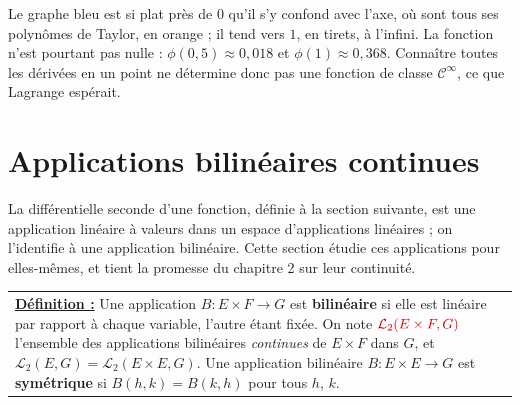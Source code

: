 \documentclass[a4paper,twoside]{report}
\newcommand{\mot}[1]{\textcolor{rougecours}{\textbf{#1}}}
\newcommand{\rmath}[1]{\textcolor{rougecours}{#1}}
\newcommand{\ee}{\mathrm{e}}                      %
\newcommand{\Cc}{\mathcal{C}}                     %
\newcommand{\Lc}{\mathcal{L}}                     %
\begin{document}
\begin{center}
\end{center}

\noindent Le graphe bleu est si plat près de $0$ qu'il s'y confond avec l'axe, où sont tous ses polynômes de Taylor, en orange ; il tend vers $1$, en tirets, à l'infini. La fonction n'est pourtant pas nulle : $\phi(0{,}5) \approx 0{,}018$ et $\phi(1) \approx 0{,}368$. Connaître toutes les dérivées en un point ne détermine donc pas une fonction de classe $\Cc^{\infty}$, ce que Lagrange espérait.
\section[Applications bilinéaires]{Applications bilinéaires continues}

La différentielle seconde d'une fonction, définie à la section suivante, est une application linéaire à valeurs dans un espace d'applications linéaires ; on l'identifie à une application bilinéaire. Cette section étudie ces applications pour elles-mêmes, et tient la promesse du chapitre 2 sur leur continuité.

\begin{center}
\begin{tabularx}{15cm}{||X}
\noindent \textbf{\underline{Définition :}} Une application $B : E \times F \to G$ est \mot{bilinéaire} si elle est linéaire par rapport à chaque variable, l'autre étant fixée. On note $\rmath{\Lc_{2}(E \times F, G)}$ l'ensemble des applications bilinéaires \emph{continues} de $E \times F$ dans $G$, et $\Lc_{2}(E, G) = \Lc_{2}(E \times E, G)$. Une application bilinéaire $B : E \times E \to G$ est \mot{symétrique} si $B(h, k) = B(k, h)$ pour tous $h$, $k$.
\end{tabularx}
\end{center}
\end{document}
